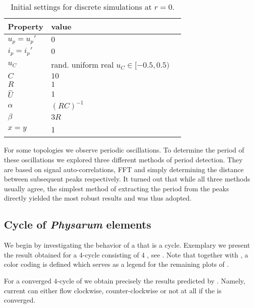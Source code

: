 	\begin{table}
        \centering
        \begin{tabular}{@{} l *2l @{}}
        \toprule
         \multicolumn{1}{c}{Property}    & value  \\ 
        \midrule
         $u_p = u_p'$ & $0$   \\ 
         $i_p = i_p'$ & $0$   \\ 
         $u_C$ & rand. uniform real $u_C \in [ -0.5 , 0.5 )$   \\ 
         $C$ & $10$ \\
         $R$ & $1$ \\
         $\hat{U}$ & $1$ \\
         $\alpha$ & $(R C)^{-1}$ \\
         $\beta$ & $3 R$ \\
         $x = y$ & 1 \\
        \bottomrule
        \end{tabular}
        \caption[Simulation initial values]{Initial settings for discrete simulations at $r=0$.}
        \label{tab:initialization}
     \end{table}

     For some topologies we observe periodic oscillations. To determine the period of these oscillations we explored three different methods of period detection. They are based on signal auto-correlations, FFT and simply determining the distance between subsequent peaks respectively. It turned out that while all three methods usually agree, the simplest method of extracting the period from the peaks directly yielded the most robust results and was thus adopted.

	\subsection{Cycle of \emph{Physarum} elements}

		We begin by investigating the behavior of a \Pn that is a cycle. Exemplary we present the result obtained for a $4$-cycle consisting of $4$ \Pes, see . Note that together with , a color coding is defined which serves as a legend for the remaining plots of .

		For a converged $4$-cycle of \Pes we obtain precisely the results predicted by . Namely, current can either flow clockwise, counter-clockwise or not at all if the \Pn is converged. 


